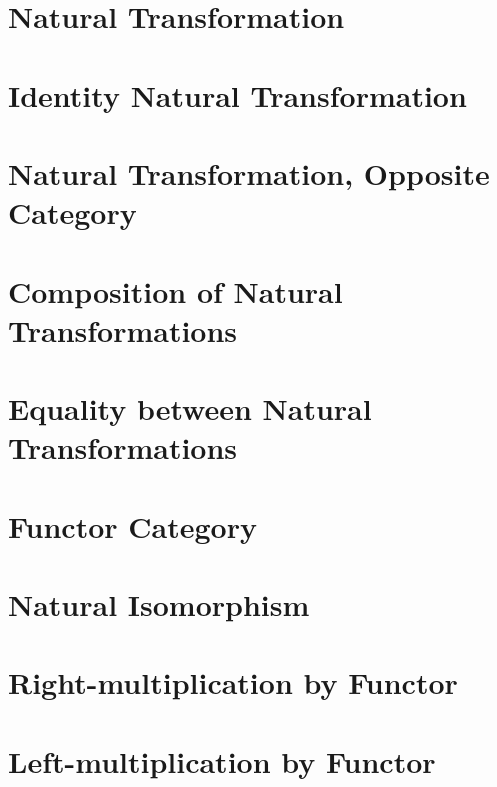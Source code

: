\section{Natural Transformation}
    
\section{Identity Natural Transformation}
    
\section{Natural Transformation, Opposite Category}
    
\section{Composition of Natural Transformations}
    
\section{Equality between Natural Transformations}
    
\section{Functor Category}
    
\section{Natural Isomorphism}
    
\section{Right-multiplication by Functor}
    
\section{Left-multiplication by Functor}
    
